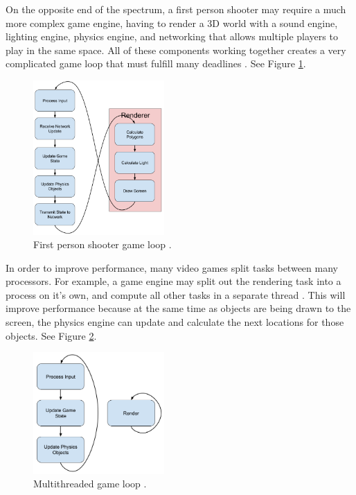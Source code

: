 \documentclass[a4paper, 12pt]{article}
\begin{document}
        On the opposite end of the spectrum, a first person shooter may require a much more complex game engine, having to render a 3D world with a sound engine, lighting engine, physics engine, and networking that allows multiple players to play in the same space. All of these components working together creates a very complicated game loop that must fulfill many deadlines \cite{grandmaster}. See Figure \ref{fps_game_loop}.

        \begin{figure}[H]
            \includegraphics[width=5cm]{fps_loop.png}
            \centering
            \caption{First person shooter game loop \cite{witters}.}
            \label{fps_game_loop}
        \end{figure}

        In order to improve performance, many video games split tasks between many processors. For example, a game engine may split out the rendering task into a process on it's own, and compute all other tasks in a separate thread \cite{cite_gameloop}. This will improve performance because at the same time as objects are being drawn to the screen, the physics engine can update and calculate the next locations for those objects. See Figure \ref{multithread_loop}.

        \begin{figure}[H]
            \includegraphics[width=5cm]{multithread_loop.png}
            \centering
            \caption{Multithreaded game loop \cite{rt_gl}.}
            \label{multithread_loop}
        \end{figure}
\end{document}
